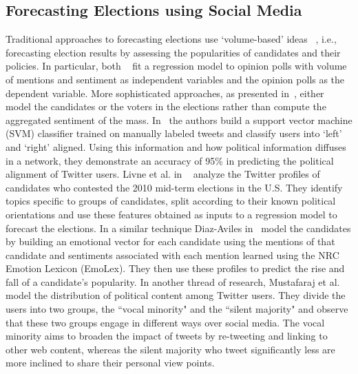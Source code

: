 \subsection{Forecasting Elections using Social Media}
Traditional approaches to forecasting elections use `volume-based' ideas
~\cite{tumasjan2010predicting,o2010tweets,saez2011total,bermingham2011using}, 
i.e., forecasting election results by assessing the popularities of candidates and their policies.
In particular, both ~\cite{o2010tweets,bermingham2011using} fit a regression model to opinion 
polls with volume of mentions and sentiment as independent variables and the opinion 
polls as the dependent variable. 
More sophisticated approaches, as presented in~\cite{livne2011party,conover2011predicting,diaz2012taking},
either model the candidates or the voters in the elections rather than compute the aggregated sentiment of the mass.  
In~\cite{conover2011predicting} the authors build a support vector machine (SVM)
classifier trained on manually labeled tweets and classify users into `left' and `right' aligned.
Using this information and how political information diffuses in a network, they demonstrate an accuracy of 95\%  in 
predicting the political alignment of Twitter users.
Livne et al. in ~\cite{livne2011party} analyze the Twitter profiles of candidates who contested 
the 2010 mid-term elections in the U.S. 
They identify topics specific to groups of candidates, split according to their known political orientations and use 
these features obtained as inputs to a regression model to forecast the elections. 
In a similar technique Diaz-Aviles in~\cite{diaz2012taking} model the candidates by building an emotional vector 
for each candidate using the mentions of that candidate and sentiments associated with each mention learned using 
the NRC Emotion Lexicon (EmoLex). 
They then use %
these profiles to predict the rise and fall of a candidate's popularity.
In another thread of research, Mustafaraj et al. ~\cite{mustafaraj2011vocal} model the distribution of political content 
among Twitter users. 
They divide the users into two groups, the ``vocal minority" and the ``silent majority" and
observe that these two groups engage in different ways over social media.
The vocal minority aims to broaden the impact of tweets by re-tweeting and linking to other web content, whereas 
the silent majority who tweet significantly less are more inclined to share their personal view points.

